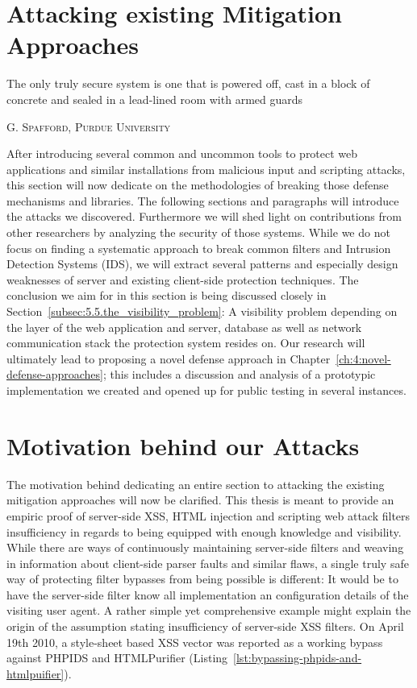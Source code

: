 \section{Attacking existing Mitigation Approaches}
\label{sec:5.attacking_existing_mitigation_approaches}

\epigraph{The only truly secure system is one that is powered off, cast in a block of concrete and sealed in a lead-lined room with armed guards}%
{\textsc{G. Spafford, Purdue University}}


  After introducing several common and uncommon tools to protect web applications and similar installations from malicious input and scripting attacks, this section will now dedicate on the methodologies of breaking those defense mechanisms and libraries. The following sections and paragraphs will introduce the attacks we discovered. Furthermore we will shed light on contributions from other researchers by analyzing the security of those systems. While we do not focus on finding a systematic approach to break common filters and Intrusion Detection Systems (IDS), we will extract several patterns and especially design weaknesses of server and existing client-side protection techniques. The conclusion we aim for in this section is being discussed closely in Section~\ref{subsec:5.5.the_visibility_problem}: A visibility problem depending on the layer of the web application and server, database as well as network communication stack the protection system resides on. Our research will ultimately lead to proposing a 
novel defense approach in Chapter~\ref{ch:4:novel-defense-approaches}; this includes a discussion and analysis of a prototypic implementation we created and opened up for public testing in several instances.

  \section{Motivation behind our Attacks}
  \label{subsec:5.1.motivation}
  
  The motivation behind dedicating an entire section to attacking the existing mitigation approaches will now be clarified. This thesis is meant to provide an empiric proof of server-side XSS, HTML injection and scripting web attack filters insufficiency in regards to being equipped with enough knowledge and visibility. While there are ways of continuously maintaining server-side filters and weaving in information about client-side parser faults and similar flaws, a single truly safe way of protecting filter bypasses from being possible is different: It would be to have the server-side filter know all implementation an configuration details of the visiting user agent. A rather simple yet comprehensive example might explain the origin of the assumption stating insufficiency of server-side XSS filters. On April 19th 2010, a style-sheet based XSS vector was reported as a working bypass against PHPIDS and HTMLPurifier (Listing~\ref{lst:bypassing-phpids-and-htmlpuifier}). \\

